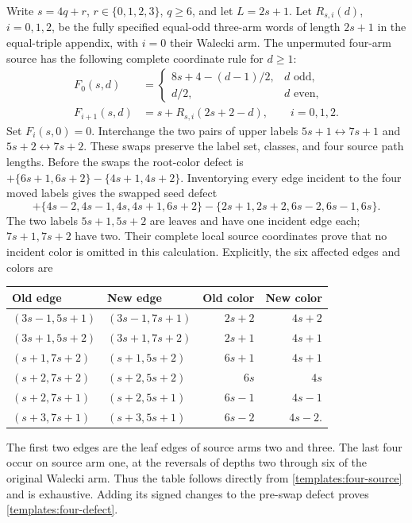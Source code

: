Write $s=4q+r$, $r\in\{0,1,2,3\}$, $q\ge6$, and let
$L=2s+1$.  Let $R_{s,i}(d)$, $i=0,1,2$, be the fully specified
equal-odd three-arm words of length $2s+1$ in the equal-triple
appendix, with $i=0$ their Walecki arm.  The unpermuted four-arm
source has the following complete coordinate rule for $d\ge1$:
\begin{equation}\label{templates:four-source}
 \begin{aligned}
 F_0(s,d)&=\begin{cases}
 8s+4-(d-1)/2,&d\text{ odd},\\ d/2,&d\text{ even},
 \end{cases}\\
 F_{i+1}(s,d)&=s+R_{s,i}(2s+2-d),\qquad i=0,1,2.
 \end{aligned}
\end{equation}
Set $F_i(s,0)=0$.  Interchange the two pairs of upper labels
$5s+1\leftrightarrow7s+1$ and $5s+2\leftrightarrow7s+2$.
These swaps preserve the label set, classes, and four source path
lengths.  Before the swaps the root-color defect is
$+\{6s+1,6s+2\}-\{4s+1,4s+2\}$.  Inventorying every edge incident
to the four moved labels gives the swapped seed defect
\begin{equation}\label{templates:four-defect}
 +\{4s-2,4s-1,4s,4s+1,6s+2\}
 -\{2s+1,2s+2,6s-2,6s-1,6s\}.
\end{equation}
The two labels $5s+1,5s+2$ are leaves and have one incident edge
each; $7s+1,7s+2$ have two.  Their complete local source coordinates
prove that no incident color is omitted in this calculation.
Explicitly, the six affected edges and colors are
\begin{center}\small
\begin{tabular}{llrr}
Old edge & New edge & Old color & New color\\\hline
$(3s-1,5s+1)$ & $(3s-1,7s+1)$ & $2s+2$ & $4s+2$\\
$(3s+1,5s+2)$ & $(3s+1,7s+2)$ & $2s+1$ & $4s+1$\\
$(s+1,7s+2)$ & $(s+1,5s+2)$ & $6s+1$ & $4s+1$\\
$(s+2,7s+2)$ & $(s+2,5s+2)$ & $6s$ & $4s$\\
$(s+2,7s+1)$ & $(s+2,5s+1)$ & $6s-1$ & $4s-1$\\
$(s+3,7s+1)$ & $(s+3,5s+1)$ & $6s-2$ & $4s-2$.
\end{tabular}\end{center}
The first two edges are the leaf edges of source arms two and three.
The last four occur on source arm one, at the reversals of depths
two through six of the original Walecki arm.  Thus the table follows
directly from \eqref{templates:four-source} and is exhaustive.  Adding
its signed changes to the pre-swap defect proves
\eqref{templates:four-defect}.

